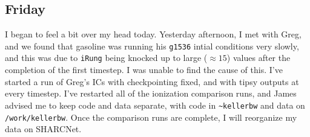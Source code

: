 \documentclass[11pt,letterpaper]{article}
\begin{document}
\subsection*{Friday}
I began to feel a bit over my head today.  Yesterday afternoon, I met with Greg,
and we found that gasoline was running his \verb!g1536! intial conditions very
slowly, and this was due to \verb!iRung! being knocked up to large ($\approx15$)
values after the completion of the first timestep.  I was unable to find the 
cause of this.  I've started a run of Greg's ICs with checkpointing fixed, and
with tipsy outputs at every timestep.  I've restarted all of the ionization 
comparison runs, and James advised me to keep code and data separate, with
code in \verb!~kellerbw! and data on \verb!/work/kellerbw!.  Once the comparison
runs are complete, I will reorganize my data on SHARCNet.
\end{document}
